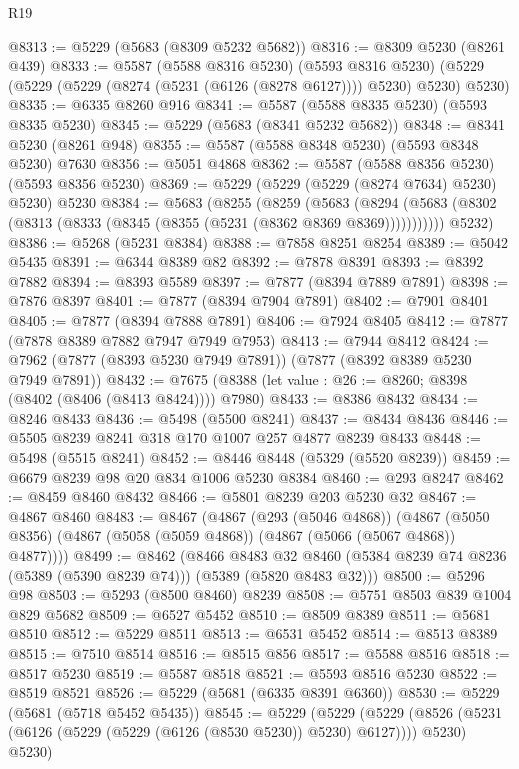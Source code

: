 \begin{lexlean}{R19}
\begin{coremodule}
@8313 := @5229 (@5683 (@8309 @5232 @5682))
@8316 := @8309 @5230 (@8261 @439)
@8333 := @5587
    (@5588 @8316 @5230)
    (@5593 @8316 @5230)
    (@5229 (@5229 (@5229 (@8274 (@5231 (@6126 (@8278 @6127)))) @5230) @5230) @5230)
@8335 := @6335 @8260 @916
@8341 := @5587 (@5588 @8335 @5230) (@5593 @8335 @5230)
@8345 := @5229 (@5683 (@8341 @5232 @5682))
@8348 := @8341 @5230 (@8261 @948)
@8355 := @5587 (@5588 @8348 @5230) (@5593 @8348 @5230) @7630
@8356 := @5051 @4868
@8362 := @5587 (@5588 @8356 @5230) (@5593 @8356 @5230)
@8369 := @5229 (@5229 (@5229 (@8274 @7634) @5230) @5230) @5230
@8384 := @5683
    (@8255
      (@8259
        (@5683 (@8294 (@5683 (@8302 (@8313 (@8333 (@8345 (@8355 (@5231 (@8362 @8369 @8369)))))))))))
      @5232)
@8386 := @5268 (@5231 @8384)
@8388 := @7858 @8251 @8254
@8389 := @5042 @5435
@8391 := @6344 @8389 @82
@8392 := @7878 @8391
@8393 := @8392 @7882
@8394 := @8393 @5589
@8397 := @7877 (@8394 @7889 @7891)
@8398 := @7876 @8397
@8401 := @7877 (@8394 @7904 @7891)
@8402 := @7901 @8401
@8405 := @7877 (@8394 @7888 @7891)
@8406 := @7924 @8405
@8412 := @7877 (@7878 @8389 @7882 @7947 @7949 @7953)
@8413 := @7944 @8412
@8424 := @7962 (@7877 (@8393 @5230 @7949 @7891)) (@7877 (@8392 @8389 @5230 @7949 @7891))
@8432 := @7675 (@8388 (let value : @26 := @8260; @8398 (@8402 (@8406 (@8413 @8424)))) @7980)
@8433 := @8386 @8432
@8434 := @8246 @8433
@8436 := @5498 (@5500 @8241)
@8437 := @8434 @8436
@8446 := @5505 @8239 @8241 @318 @170 @1007 @257 @4877 @8239 @8433
@8448 := @5498 (@5515 @8241)
@8452 := @8446 @8448 (@5329 (@5520 @8239))
@8459 := @6679 @8239 @98 @20 @834 @1006 @5230 @8384
@8460 := @293 @8247
@8462 := @8459 @8460 @8432
@8466 := @5801 @8239 @203 @5230 @32
@8467 := @4867 @8460
@8483 := @8467
    (@4867
      (@293 (@5046 @4868))
      (@4867 (@5050 @8356) (@4867 (@5058 (@5059 @4868)) (@4867 (@5066 (@5067 @4868)) @4877))))
@8499 := @8462
    (@8466
      @8483
      @32
      @8460
      (@5384 @8239 @74 @8236 (@5389 (@5390 @8239 @74)))
      (@5389 (@5820 @8483 @32)))
@8500 := @5296 @98
@8503 := @5293 (@8500 @8460) @8239
@8508 := @5751 @8503 @839 @1004 @829 @5682
@8509 := @6527 @5452
@8510 := @8509 @8389
@8511 := @5681 @8510
@8512 := @5229 @8511
@8513 := @6531 @5452
@8514 := @8513 @8389
@8515 := @7510 @8514
@8516 := @8515 @856
@8517 := @5588 @8516
@8518 := @8517 @5230
@8519 := @5587 @8518
@8521 := @5593 @8516 @5230
@8522 := @8519 @8521
@8526 := @5229 (@5681 (@6335 @8391 @6360))
@8530 := @5229 (@5681 (@5718 @5452 @5435))
@8545 := @5229
    (@5229
      (@5229 (@8526 (@5231 (@6126 (@5229 (@5229 (@6126 (@8530 @5230)) @5230) @6127)))) @5230)
      @5230)

\end{coremodule}
\end{lexlean}
